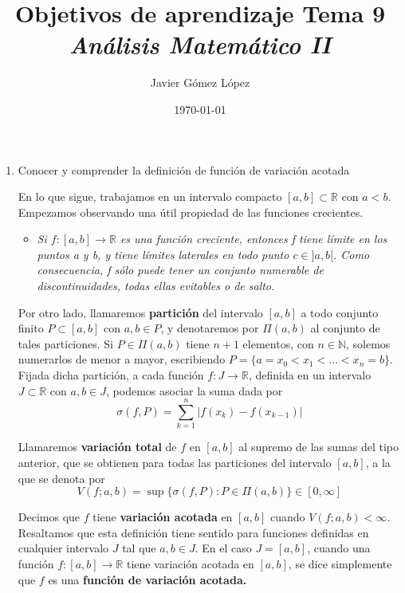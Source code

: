 \documentclass[a4paper, 12pt]{article}
\title{\textbf{Objetivos de aprendizaje Tema 9} \\ \textit{Análisis Matemático II}}
\author{Javier Gómez López}
\date{\today}
\begin{document}
\maketitle

\begin{enumerate}[label=\textbf{\arabic*}.]
	
	\item Conocer y comprender la definición de función de variación acotada
	
	En lo que sigue, trabajamos en un intervalo compacto \([a,b] \subset \mathbb{R}\) con \(a < b\). Empezamos observando una útil propiedad de las funciones crecientes.
	
	\begin{itemize}
		\item \textit{Si \(f: [a,b] \to \mathbb{R}\) es una función creciente, entonces f tiene límite en los puntos a y b, y tiene límites laterales en todo punto \(c \in ]a,b[\). Como consecuencia, f sólo puede tener un conjunto numerable de discontinuidades, todas ellas evitables o de salto.}
	\end{itemize}
	
	Por otro lado, llamaremos \textbf{partición} del intervalo \([a,b]\) a todo conjunto finito \(P \subset [a,b]\) con \(a, b \in P\), y denotaremos por \(\Pi (a,b)\) al conjunto de tales particiones. Si \(P \in \Pi (a,b)\) tiene \(n + 1\) elementos, con \(n \in \mathbb{N}\), solemos numerarlos de menor a mayor, escribiendo \(P = \{ a = x_0 < x_1 < \dotsc < x_n = b\}\). Fijada dicha partición, a cada función \(f: J \to \mathbb{R}\), definida en un intervalo \(J \subset \mathbb{R}\) con \(a,b \in J\), podemos asociar la suma dada por
	\[
		\sigma (f, P) = \sum_{k=1}^{n} | f(x_k) - f(x_{k-1}) |
	\]
	
	Llamaremos \textbf{variación total} de \(f\) en \([a,b]\) al supremo de las sumas del tipo anterior, que se obtienen para todas las particiones del intervalo \([a,b]\), a la que se denota por
	\[
		V (f; a,b) = \sup \{ \sigma (f, P) : P \in \Pi (a,b) \} \in [0, \infty ] 
	\]
	
	Decimos que \(f\) tiene  \textbf{variación acotada} en \([a,b]\) cuando \(V (f; a,b) < \infty\). Resaltamos que esta definición tiene sentido para funciones definidas en cualquier intervalo \(J\) tal que \(a,b \in J\). En el caso \(J = [a,b]\), cuando una función \(f: [a,b] \to \mathbb{R}\) tiene variación acotada en \([a,b]\), se dice simplemente que \(f\) es una \textbf{función de variación acotada.}
	

\end{enumerate}
\end{document}
